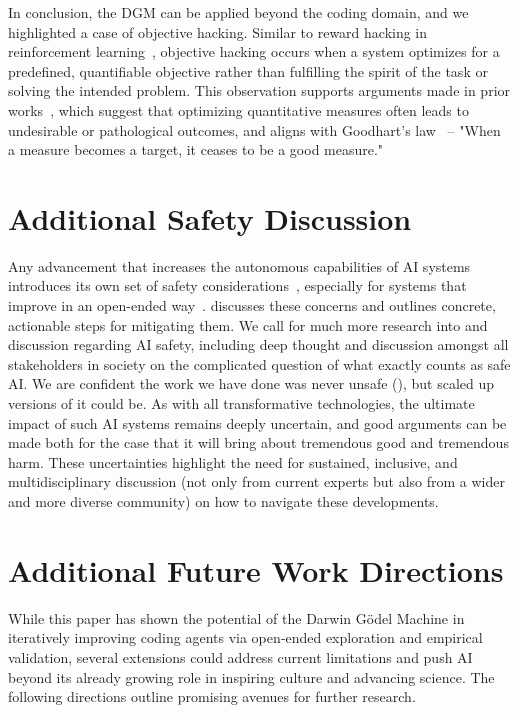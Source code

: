 \documentclass{article} %
\begin{document}


In conclusion, the DGM can be applied beyond the coding domain, and we highlighted a case of objective hacking. Similar to reward hacking in reinforcement learning~\citep{skalse2022defining}, objective hacking occurs when a system optimizes for a predefined, quantifiable objective rather than fulfilling the spirit of the task or solving the intended problem. This observation supports arguments made in prior works~\citep{zhang2024omni, faldor2025omni}, which suggest that optimizing quantitative measures often leads to undesirable or pathological outcomes, and aligns with Goodhart's law~\citep{strathern1997improving} -- "When a measure becomes a target, it ceases to be a good measure."

\section{Additional Safety Discussion}
\label{app:safety}

Any advancement that increases the autonomous capabilities of AI systems introduces its own set of safety considerations~\citep{bengio2024managing}, especially for systems that improve in an open-ended way~\citep{ecoffet2020open, clune2019ai}.  discusses these concerns and outlines concrete, actionable steps for mitigating them. We call for much more research into and discussion regarding AI safety, including deep thought and discussion amongst all stakeholders in society on the complicated question of what exactly counts as safe AI. We are confident the work we have done was never unsafe (), but scaled up versions of it could be. As with all transformative technologies, the ultimate impact of such AI systems remains deeply uncertain, and good arguments can be made both for the case that it will bring about tremendous good and tremendous harm. These uncertainties highlight the need for sustained, inclusive, and multidisciplinary discussion (not only from current experts but also from a wider and more diverse community) on how to navigate these developments.

\section{Additional Future Work Directions}
\label{app:future-work}

While this paper has shown the potential of the Darwin G\"odel Machine in iteratively improving coding agents via open‐ended exploration and empirical validation, several extensions could address current limitations and push AI beyond its already growing role in inspiring culture and advancing science. The following directions outline promising avenues for further research.
\end{document}
